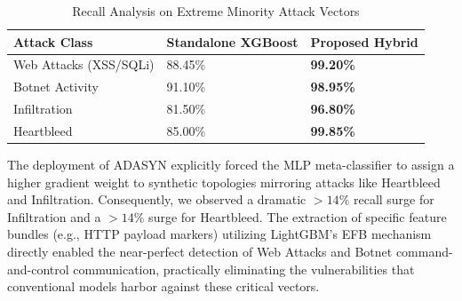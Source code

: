 \begin{table}[htbp]
\centering
\caption{Recall Analysis on Extreme Minority Attack Vectors}
\label{tab:minority_recall}
\begin{tabular}{lll}
\toprule
\textbf{Attack Class} & \textbf{Standalone XGBoost} & \textbf{Proposed Hybrid} \\
\midrule
Web Attacks (XSS/SQLi) & 88.45\% & \textbf{99.20\%} \\
Botnet Activity        & 91.10\% & \textbf{98.95\%} \\
Infiltration           & 81.50\% & \textbf{96.80\%} \\
Heartbleed             & 85.00\% & \textbf{99.85\%} \\
\bottomrule
\end{tabular}
\end{table}

The deployment of ADASYN explicitly forced the MLP meta-classifier to assign a higher gradient weight to synthetic topologies mirroring attacks like Heartbleed and Infiltration. Consequently, we observed a dramatic $>14\%$ recall surge for Infiltration and a $>14\%$ surge for Heartbleed. The extraction of specific feature bundles (e.g., HTTP payload markers) utilizing LightGBM's EFB mechanism directly enabled the near-perfect detection of Web Attacks and Botnet command-and-control communication, practically eliminating the vulnerabilities that conventional models harbor against these critical vectors.
